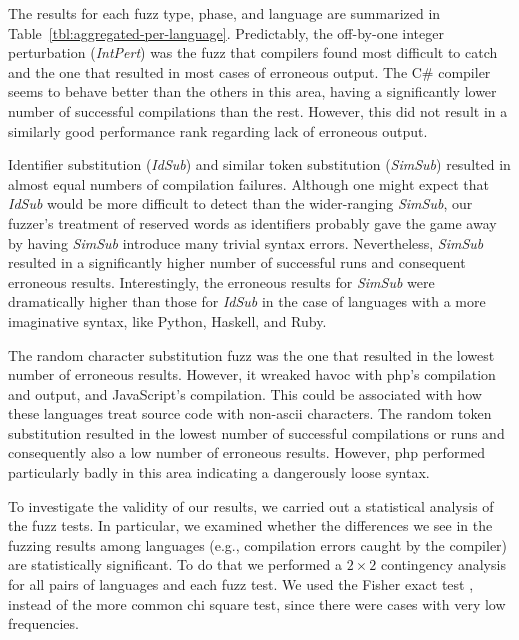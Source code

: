\documentclass[10pt]{sigplanconf}
\begin{document}
The results for each fuzz type, phase, and language are summarized in
Table~\ref{tbl:aggregated-per-language}.
Predictably, the off-by-one integer perturbation ({\em IntPert})
was the fuzz that
compilers found most difficult to catch and the one that resulted
in most cases of erroneous output.
The C\# compiler seems to behave better than the others in this area,
having a significantly lower number of successful compilations than the
rest.
However, this did not result in a similarly good performance rank
regarding lack of erroneous output.

Identifier substitution ({\em IdSub}) and similar token substitution
({\em SimSub}) resulted in almost equal numbers of compilation failures.
Although one might expect that {\em IdSub} would be more difficult
to detect than the wider-ranging {\em SimSub},
our fuzzer's treatment of reserved words as identifiers
probably gave the game away by having {\em SimSub} introduce many
trivial syntax errors.
Nevertheless, {\em SimSub} resulted in a significantly higher number
of successful runs and consequent erroneous results.
Interestingly,
the erroneous results for {\em SimSub} were dramatically higher
than those for {\em IdSub} in the case of
languages with a more imaginative syntax, like Python, Haskell, and Ruby.

The random character substitution fuzz was the one that resulted in
the lowest number of erroneous results. However, it wreaked havoc with
{\sc php}'s compilation and output, and JavaScript's compilation. This
could be associated with how these languages treat source code with
non-{\sc ascii} characters. The random token substitution resulted in
the lowest number of successful compilations or runs and consequently
also a low number of erroneous results. However, {\sc php} performed
particularly badly in this area indicating a dangerously loose syntax.

To investigate the validity of our results, we carried out a
statistical analysis of the fuzz tests. In particular, we examined
whether the differences we see in the fuzzing results among languages
(e.g., compilation errors caught by the compiler) are statistically
significant. To do that we performed a $2\times 2$ contingency
analysis for all pairs of languages and each fuzz test. We used the
Fisher exact test \cite{Fis35},
instead of the more common chi square test,
since there were cases with very low frequencies.
\end{document}

